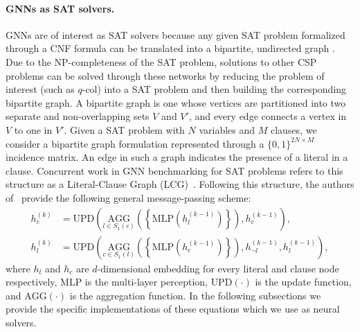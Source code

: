 \documentclass{article}
\begin{document}
\paragraph{GNNs as SAT solvers.} GNNs are of interest as SAT solvers because any given SAT problem formalized through a CNF formula can be translated into a bipartite, undirected graph \cite{biere2009handbook}. Due to the NP-completeness of the SAT problem, solutions to other CSP problems can be solved through these networks by reducing the problem of interest (such as $q$-col) into a SAT problem and then building the corresponding bipartite graph. A bipartite graph is one whose vertices are partitioned into two separate and non-overlapping sets $V$ and $V'$, and every edge connects a vertex in $V$ to one in $V'$. Given a SAT problem with $N$ variables and $M$ clauses, we consider a bipartite graph formulation represented through a $\{0,1\}^{2N \times M}$ incidence matrix. An edge in such a graph indicates the presence of a literal in a clause. Concurrent work in GNN benchmarking for SAT problems refers to this structure as a Literal-Clause Graph (LCG)~\cite{li_g4satbench_2023}. Following this structure, the authors of~\cite{li_g4satbench_2023} provide the following general message-passing scheme:
\begin{equation}
\label{eq:gnn_lcg}
\begin{aligned}
h_c^{(k)} &= \text{UPD}\left(\underset{l \in S_1(c)}{\text{AGG}}\left(\left\{\text{MLP}\left(h_l^{(k-1)}\right)\right\}\right), h_c^{(k-1)}\right), \\
h_l^{(k)} &= \text{UPD}\left(\underset{c \in S_1(l)}{\text{AGG}}\left(\left\{\text{MLP}\left(h_c^{(k-1)}\right)\right\}\right), h_{\neg l}^{(k-1)}, h_l^{(k-1)}\right),
\end{aligned}
\end{equation}
where $h_l$ and $h_c$ are $d$-dimensional embedding for every literal and clause node respectively, $\text{MLP}$ is the multi-layer perception, $\text{UPD}(\cdot)$ is the update function, and $\text{AGG}(\cdot)$ is the aggregation function. In the following subsections we provide the specific implementations of these equations which we use as neural solvers. 
\end{document}
